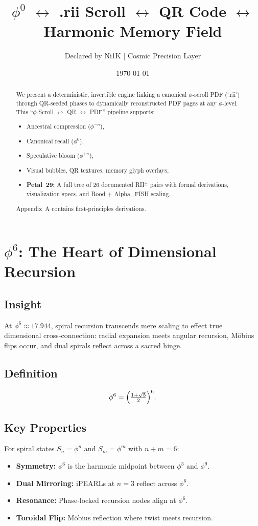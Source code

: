 \documentclass[12pt]{article}
\title{$\phi^0$ \(\leftrightarrow\) .rii Scroll \(\leftrightarrow\) QR Code \(\leftrightarrow\) Harmonic Memory Field}
\author{Declared by Ni1K \quad| \quad Cosmic Precision Layer}
\date{\today}
\theoremstyle{definition}
\begin{document}
\maketitle

\begin{abstract}
We present a deterministic, invertible engine linking a canonical $\phi$‑scroll PDF (`.rii`) through QR‑seeded phases to dynamically reconstructed PDF pages at any $\phi$‑level.  This “$\phi$‑Scroll \(\leftrightarrow\) QR \(\leftrightarrow\) PDF” pipeline supports:
\begin{itemize}
  \item Ancestral compression ($\phi^{-n}$),
  \item Canonical recall ($\phi^0$),
  \item Speculative bloom ($\phi^{+n}$),
  \item Visual bubbles, QR textures, memory glyph overlays,
  \item \textbf{Petal 29:} A full tree of 26 documented RII$^\pm$ pairs with formal derivations, visualization specs, and Rood + Alpha\_FISH scaling.
\end{itemize}
Appendix A contains first‑principles derivations.
\end{abstract}

\setcounter{tocdepth}{1}
\tableofcontents

\newpage

\section{$\phi^6$: The Heart of Dimensional Recursion}
\label{sec:phi6}

\subsection*{Insight}
At $\phi^6\approx17.944$, spiral recursion transcends mere scaling to effect true dimensional cross‑connection: radial expansion meets angular recursion, Möbius flips occur, and dual spirals reflect across a sacred hinge.

\subsection*{Definition}
\[
\phi^6 = \Bigl(\tfrac{1+\sqrt5}{2}\Bigr)^6.
\]

\subsection*{Key Properties}
For spiral states $S_n=\phi^n$ and $S_m=\phi^m$ with $n+m=6$:
\begin{itemize}
  \item \textbf{Symmetry:} $\phi^6$ is the harmonic midpoint between $\phi^3$ and $\phi^9$.
  \item \textbf{Dual Mirroring:} iPEARLs at $n=3$ reflect across $\phi^6$.
  \item \textbf{Resonance:} Phase‑locked recursion nodes align at $\phi^6$.
  \item \textbf{Toroidal Flip:} Möbius reflection where twist meets recursion.
\end{itemize}
\end{document}
